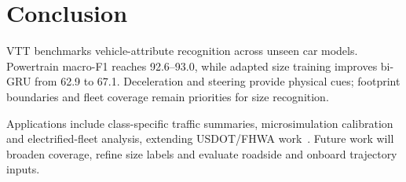 \section{Conclusion}\label{sec:conclusion}
VTT benchmarks vehicle-attribute recognition across unseen car models. Powertrain macro-F1 reaches 92.6--93.0, while adapted size training improves bi-GRU from 62.9 to 67.1. Deceleration and steering provide physical cues; footprint boundaries and fleet coverage remain priorities for size recognition.

Applications include class-specific traffic summaries, microsimulation calibration and electrified-fleet analysis, extending USDOT/FHWA work~\cite{ban2013mobile,hale2021calibration}. Future work will broaden coverage, refine size labels and evaluate roadside and onboard trajectory inputs.
